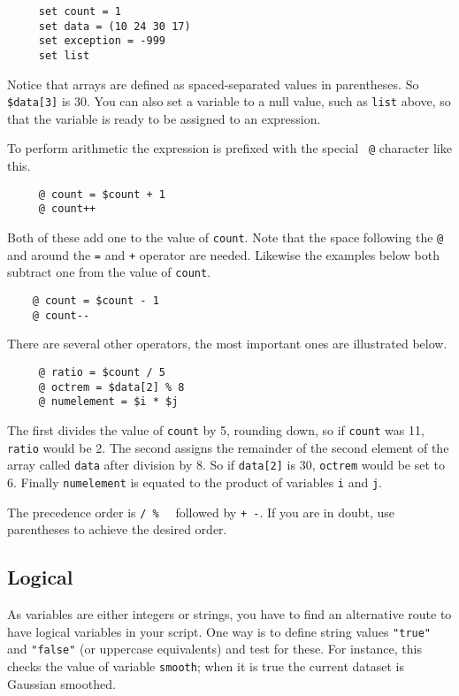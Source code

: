 \small
\begin{verbatim}
     set count = 1
     set data = (10 24 30 17)
     set exception = -999
     set list
\end{verbatim}
\normalsize

Notice that arrays are defined as spaced-separated values in
parentheses.  So {\tt \$data[3]} is 30.  You can also set a variable
to a null value, such as {\tt list} above, so that the variable is
ready to be assigned to an expression.

To perform arithmetic the expression is prefixed with the special {\tt
@} character like this.

\small
\begin{verbatim}
     @ count = $count + 1
     @ count++
\end{verbatim}
\normalsize
Both of these add one to the value of {\tt count}.  Note that the space
following the {\tt @} and around the {\tt =} and {\tt +} operator are
needed.  Likewise the examples below both subtract one from the value of
{\tt count}.

\small
\begin{verbatim}
    @ count = $count - 1
    @ count--
\end{verbatim}
\normalsize

There are several other operators, the most important ones are
illustrated below.

\small
\begin{verbatim}
     @ ratio = $count / 5
     @ octrem = $data[2] % 8
     @ numelement = $i * $j
\end{verbatim}
\normalsize
The first divides the value of {\tt count} by 5, rounding down, so
if {\tt count} was 11, {\tt ratio} would be 2.  The second assigns
the remainder of the second element of the array called {\tt data}
after division by 8.  So if {\tt data[2]} is 30, {\tt octrem} would be
set to 6.  Finally {\tt numelement} is equated to the product of
variables {\tt i} and {\tt j}.

The precedence order is {\tt * / \%}~~ followed by {\tt + -}.  If
you are in doubt, use parentheses to achieve the desired order.

\newpage
\subsection{Logical\label{sc4_se_logical}}

As variables are either integers or strings, you have to find an
alternative route to have logical variables in your script.  One way is
to define string values {\tt "true"} and {\tt "false"} (or uppercase
equivalents) and test for these.  For instance, this checks the value of
variable {\tt smooth};  when it is true the current dataset is Gaussian
smoothed.

